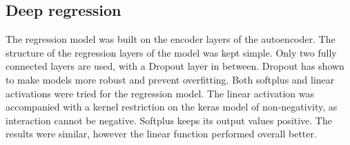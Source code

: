 \subsection{Deep regression}

The regression model was built on the encoder layers of the autoencoder. The structure of the regression layers of the model was kept simple. Only two fully connected layers are used, with a Dropout layer in between. Dropout has shown to make models more robust and prevent overfitting. 
Both softplus and linear activations were tried for the regression model. The linear activation was accompanied with a kernel restriction on the keras model of non-negativity, as interaction cannot be negative. Softplus keeps its output values positive. The results were similar, however the linear function performed overall better.
